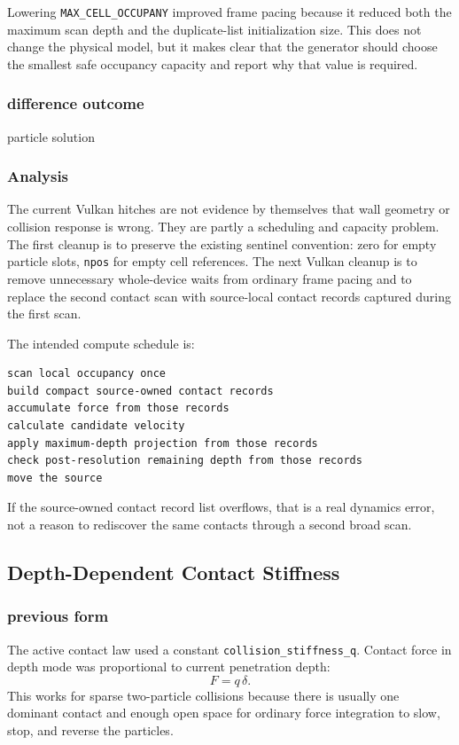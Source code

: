 Lowering \texttt{MAX\_CELL\_OCCUPANY} improved frame pacing because it reduced
both the maximum scan depth and the duplicate-list initialization size.  This
does not change the physical model, but it makes clear that the generator
should choose the smallest safe occupancy capacity and report why that value
is required.

\subsubsection{difference outcome}

particle solution

\subsubsection{Analysis}

The current Vulkan hitches are not evidence by themselves that wall geometry
or collision response is wrong.  They are partly a scheduling and capacity
problem.  The first cleanup is to preserve the existing sentinel convention:
zero for empty particle slots, \texttt{npos} for empty cell references.  The
next Vulkan cleanup is to remove unnecessary whole-device waits from ordinary
frame pacing and to replace the second contact scan with source-local contact
records captured during the first scan.

The intended compute schedule is:
\begin{verbatim}
scan local occupancy once
build compact source-owned contact records
accumulate force from those records
calculate candidate velocity
apply maximum-depth projection from those records
check post-resolution remaining depth from those records
move the source
\end{verbatim}
If the source-owned contact record list overflows, that is a real dynamics
error, not a reason to rediscover the same contacts through a second broad
scan.

\subsection{Depth-Dependent Contact Stiffness}

\subsubsection{previous form}

The active contact law used a constant \texttt{collision\_stiffness\_q}.
Contact force in depth mode was proportional to current penetration depth:
\[
    F = q\,\delta .
\]
This works for sparse two-particle collisions because there is usually one
dominant contact and enough open space for ordinary force integration to slow,
stop, and reverse the particles.

